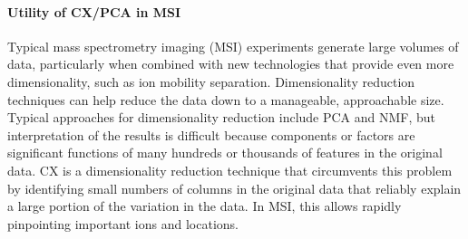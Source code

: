\paragraph{Utility of CX/PCA in MSI}
Typical mass spectrometry imaging (MSI) experiments generate large volumes of data, particularly when combined with new
technologies that provide even more dimensionality, such as ion mobility separation.
Dimensionality reduction techniques can help reduce the data down to a manageable, approachable size.
Typical approaches for dimensionality reduction include PCA and NMF, but interpretation of the results is difficult
because components or factors are significant functions of many hundreds or thousands of features in the original data.
CX is a dimensionality reduction technique that circumvents this problem by identifying small numbers of columns in the
original data that reliably explain a large portion of the variation in the data.
In MSI, this allows rapidly pinpointing important ions and locations.

